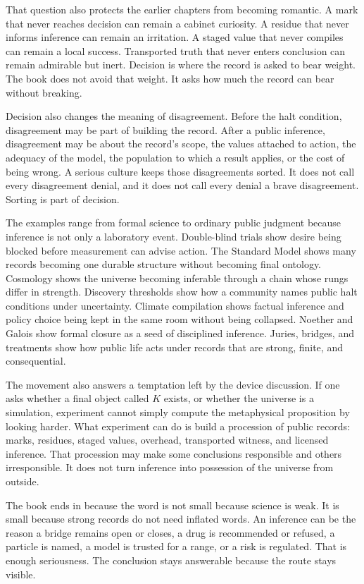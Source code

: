 \begin{chapteressay}
That question also protects the earlier chapters from becoming romantic. A
mark that never reaches decision can remain a cabinet curiosity. A residue
that never informs inference can remain an irritation. A staged value that
never compiles can remain a local success. Transported truth that never enters
conclusion can remain admirable but inert. Decision is where the record is
asked to bear weight. The book does not avoid that weight. It asks how much
the record can bear without breaking.

Decision also changes the meaning of disagreement. Before the halt condition,
disagreement may be part of building the record. After a public inference,
disagreement may be about the record's scope, the values attached to action,
the adequacy of the model, the population to which a result applies, or the
cost of being wrong. A serious culture keeps those disagreements sorted. It
does not call every disagreement denial, and it does not call every denial a
brave disagreement. Sorting is part of decision.

The examples range from formal science to ordinary public judgment
because inference is not only a laboratory event. Double-blind trials show
desire being blocked before measurement can advise action. The Standard Model
shows many records becoming one durable structure without becoming final
ontology. Cosmology shows the universe becoming inferable through a chain
whose rungs differ in strength. Discovery thresholds show how a community
names public halt conditions under uncertainty. Climate compilation shows
factual inference and policy choice being kept in the same room without being
collapsed. Noether and Galois show formal closure as a seed of disciplined
inference. Juries, bridges, and treatments show how public life acts under
records that are strong, finite, and consequential.

The movement also answers a temptation left by the device discussion. If one
asks whether a final object called \(K\) exists, or whether the universe is a
simulation, experiment cannot simply compute the metaphysical proposition by
looking harder. What experiment can do is build a procession of public
records: marks, residues, staged values, overhead, transported witness, and
licensed inference. That procession may make some conclusions responsible and
others irresponsible. It does not turn inference into possession of the
universe from outside.

The book ends in  because the word is not small because science
is weak. It is small because strong records do not need inflated
words. An inference can be the reason a bridge remains open or closes, a drug
is recommended or refused, a particle is named, a model is trusted for a
range, or a risk is regulated. That is enough seriousness. The conclusion
stays answerable because the route stays visible.


\end{chapteressay}
